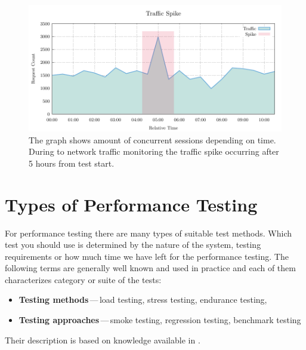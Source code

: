 \begin{figure}[H]
  \centering
  \includegraphics[width=14cm]{obrazky-figures/traffic_spike.pdf}
  \caption{The graph shows amount of concurrent sessions depending on time. During to network traffic monitoring the traffic spike occurring after 5 hours from test start.}
  \label{fig:spikes}
\end{figure}

\section{Types of Performance Testing}
\label{Types of Performance Testing}

For performance testing there are many types of suitable test methods. Which test you should use is determined by the nature of the system, testing requirements or how much time we have left for the performance testing. The following terms are generally well known and used in practice and each of them characterizes category or suite of the tests:
\begin{itemize}
	\item \textbf{Testing methods}\,---\,load testing, stress testing, endurance testing, 
	\item \textbf{Testing approaches}\,---\,smoke testing, regression testing, benchmark testing
\end{itemize}

Their description is based on knowledge available in \cite{TuPo:TESTS, BUCH:4TYPES, Molyneaux:TAoAPT, ISTQB}.

